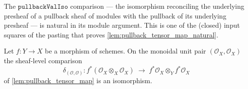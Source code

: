 \begin{lemma}


  \label{lem:pullback_val_iso_natural}
  The \(\mathtt{pullbackValIso}\) comparison --- the isomorphism reconciling the underlying
  presheaf of a pullback sheaf of modules with the pullback of its underlying presheaf ---
  is natural in its module argument. This is one of the (closed) input squares of the
  pasting that proves \cref{lem:pullback_tensor_map_natural}.
\end{lemma}

\begin{lemma}


  \label{lem:pullback_tensor_iso_unit}
  Let \(f : Y \to X\) be a morphism of schemes. On the monoidal unit pair
  \((\mathcal{O}_X, \mathcal{O}_X)\) the sheaf-level comparison
  \[
    \delta_{(\mathcal{O},\mathcal{O})} :
      f^*(\mathcal{O}_X \otimes_X \mathcal{O}_X)
      \;\longrightarrow\;
      f^*\mathcal{O}_X \otimes_Y f^*\mathcal{O}_X
  \]
  of \cref{lem:pullback_tensor_map} is an isomorphism.
\end{lemma}

